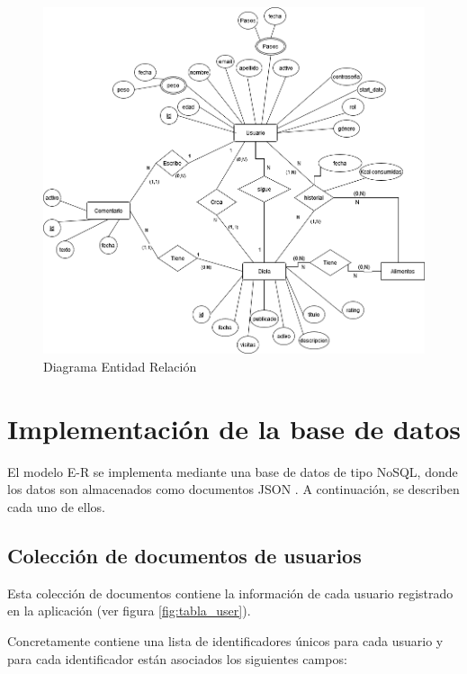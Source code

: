 \begin{figure}[H]
    \centering
    \includegraphics[width=\textwidth]{Images/Capitulo5/bbdd.drawio.png}
    \caption{Diagrama Entidad Relación}
    \label{fig:diagrama_e_r}
\end{figure}

\section{Implementación de la base de datos}
El modelo E-R se implementa mediante una base de datos de tipo NoSQL, donde los datos son almacenados como documentos JSON \cite{json}. A continuación, se describen cada uno de ellos.

\subsection{Colección de documentos de usuarios}
Esta colección de documentos contiene la información de cada usuario registrado en la aplicación (ver figura \ref{fig:tabla_user}).

Concretamente contiene una lista de identificadores únicos para cada usuario y para cada identificador están asociados los siguientes campos:

